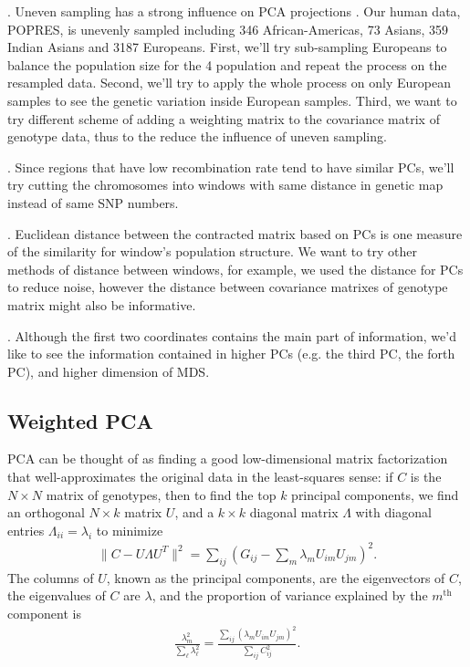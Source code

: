 \documentclass[11pt, oneside]{article}   	%
\begin{document}
. Uneven sampling has a strong influence on PCA projections \citep{mcvean2009genealogical}. 
Our human data, POPRES, is unevenly sampled including 346 African-Americas, 73 Asians, 359 Indian Asians and 3187 Europeans. 
First, we'll try sub-sampling Europeans to balance the population size for the 4 population and repeat the process on the resampled data. 
Second, we'll try to apply the whole process on only European samples to see the genetic variation inside European samples. 
Third, we want to try different scheme of adding a weighting matrix to the covariance matrix of genotype data, thus to the reduce the influence of uneven sampling.

. Since regions that have low recombination rate tend to have similar PCs, we'll try cutting the chromosomes into windows with same distance in genetic map instead of same SNP numbers.

. Euclidean distance between the contracted matrix based on PCs is one measure of the similarity for window's population structure.
We want to try other methods of distance between windows, for example, we used the distance for PCs to reduce noise, however the distance between covariance matrixes of genotype matrix might also be informative.

. Although the first two coordinates contains the main part of information, we'd like to see the information contained in higher PCs (e.g. the third PC, the forth PC), and higher dimension of MDS.


  

\appendix

\subsection{Weighted PCA}

PCA can be thought of as finding a good low-dimensional matrix factorization \citep{engelhardt2010analysis}
that well-approximates the original data in the least-squares sense:
if $C$ is the $N \times N$ matrix of genotypes, 
then to find the top $k$ principal components, 
we find an orthogonal $N \times k$ matrix $U$,
and a $k \times k$ diagonal matrix $\Lambda$ with diagonal entries $\Lambda_{ii}=\lambda_i$ to minimize
\begin{align} \label{eqn:objective}
    \| C - U \Lambda U^T \|^2 = \sum_{ij} \left( G_{ij} - \sum_m \lambda_{m} U_{im} U_{jm} \right)^2 .
\end{align}
The columns of $U$, known as the principal components, are the eigenvectors of $C$,
the eigenvalues of $C$ are $\lambda$, and the proportion of variance explained by the $m^\text{th}$ component is
\begin{align*}
    \frac{ \lambda_m^2 }{ \sum_\ell \lambda_\ell^2 } = \frac{ \sum_{ij} ( \lambda_m U_{im} U_{jm} )^2 }{ \sum_{ij} C_{ij}^2 } .
\end{align*}
\end{document}
